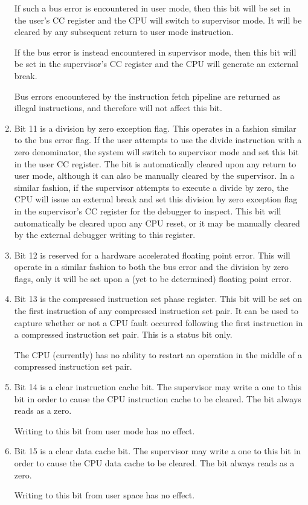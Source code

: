 \documentclass{gqtekspec}
\begin{document}
\begin{enumerate}
	If such a bus error is encountered in user mode, then this bit will be
	set in the user's CC register and the CPU will switch to supervisor
	mode.  It will be cleared by any subsequent return to user mode
	instruction.

	If the bus error is instead encountered in supervisor mode, then this
	bit will be set in the supervisor's CC register and the CPU will
	generate an external break.

	Bus errors encountered by the instruction fetch pipeline are returned
	as illegal instructions, and therefore will not affect this bit.

\item Bit 11 is a division by zero exception flag.  This operates
	in a fashion similar to the bus error flag.  If the user attempts
	to use the divide instruction with a zero denominator, the system
	will switch to supervisor mode and set this bit in the user CC
	register.  The bit is automatically cleared upon any return to user
	mode, although it can also be manually cleared by the supervisor.  In
	a similar fashion, if the supervisor attempts to execute a divide by
	zero, the CPU will issue an external break and set this division by
	zero exception flag in the supervisor's CC register for the debugger
	to inspect.  This bit will automatically be cleared upon any CPU
	reset, or it may be manually cleared by the external debugger writing
	to this register.

\item Bit 12 is reserved for a hardware accelerated floating point error.
	This will operate in a similar fashion to both the bus error and
	the division by zero flags, only it will be set upon a (yet to
	be determined) floating point error.

\item Bit 13 is the compressed instruction set phase register.  This
	bit will be set on the first instruction of any compressed instruction
	set pair.  It can be used to capture whether or not a CPU fault
	occurred following the first instruction in a compressed instruction
	set pair.  This is a status bit only.

	The CPU (currently) has no ability to restart an operation in the
	middle of a compressed instruction set pair.

\item Bit 14 is a clear instruction cache bit.  The supervisor may write a one
	to this bit in order to cause the CPU instruction cache to be cleared.
	The bit always reads as a zero.

	Writing to this bit from user mode has no effect.

\item Bit 15 is a clear data cache bit.  The supervisor may write a one
	to this bit in order to cause the CPU data cache to be cleared.
	The bit always reads as a zero.

	Writing to this bit from user space has no effect.
\end{enumerate}
\end{document}

